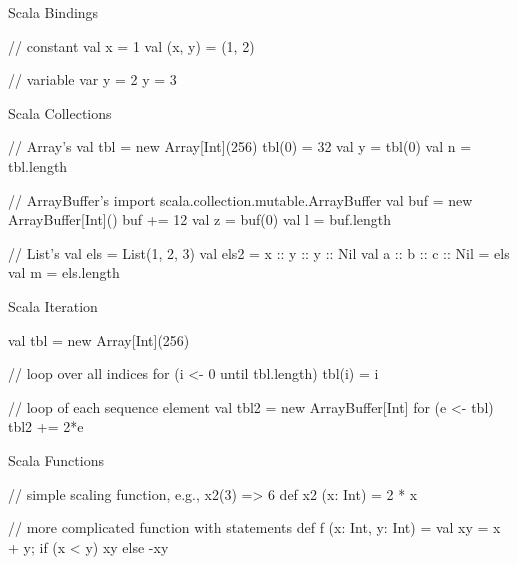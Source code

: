 \begin{frame}[fragile]{Scala Bindings}
\begin{scala}
// constant
val x = 1
val (x, y) = (1, 2)

// variable
var y = 2
y = 3
\end{scala}
\end{frame}

\begin{frame}[fragile]{Scala Collections}
\begin{scala}
// Array's
val tbl = new Array[Int](256)
tbl(0) = 32
val y = tbl(0)
val n = tbl.length

// ArrayBuffer's
import scala.collection.mutable.ArrayBuffer
val buf = new ArrayBuffer[Int]()
buf += 12
val z = buf(0)
val l = buf.length

// List's
val els = List(1, 2, 3)
val els2 = x :: y :: y :: Nil
val a :: b :: c :: Nil = els
val m = els.length

\end{scala}
\end{frame}



\begin{frame}[fragile]{Scala Iteration}
\begin{scala}
val tbl = new Array[Int](256)

// loop over all indices
for (i <- 0 until tbl.length)
  tbl(i) = i

// loop of each sequence element
val tbl2 = new ArrayBuffer[Int]
for (e <- tbl)
  tbl2 += 2*e
\end{scala}


\end{frame}

\begin{frame}[fragile]{Scala Functions}
\begin{scala}
// simple scaling function, e.g., x2(3) => 6
def x2 (x: Int) = 2 * x
\end{scala}

\begin{scala}
// more complicated function with statements
def f (x: Int, y: Int) = {
  val xy = x + y;
  if (x < y) xy else -xy
}
\end{scala}
\end{frame}

